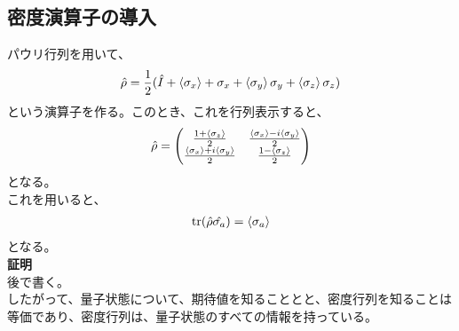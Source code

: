 \documentclass[a4paper,11pt]{jsarticle}
\begin{document}
\subsection{密度演算子の導入}
パウリ行列を用いて、
\begin{align}
    \hat{\rho} =\frac{1}{2}(\hat I +\ev{\sigma_x}+\sigma_x + \ev{\sigma_y}\sigma_y + \ev{\sigma_z}\sigma_z)
\end{align}
という演算子を作る。このとき、これを行列表示すると、
\begin{align}
    \hat{\rho} = \begin{pmatrix}
        \frac{1+\ev{\sigma_z}}{2} & \frac{\ev{\sigma_x}-i\ev{\sigma_y}}{2} \\
        \frac{\ev{\sigma_x}+i\ev{\sigma_y}}{2} & \frac{1-\ev{\sigma_z}}{2}
    \end{pmatrix}
\end{align}
となる。\\
これを用いると、
\begin{align}
    \trace({\hat{\rho}\hat{\sigma_a}})=\ev{\sigma_a}
\end{align}
となる。\\
\textbf{証明}\\
後で書く。\\%

したがって、量子状態について、期待値を知ることとと、密度行列を知ることは等価であり、密度行列は、量子状態のすべての情報を持っている。\\
\end{document}
